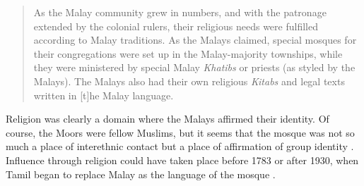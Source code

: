 \begin{quote}
    As the Malay community grew in numbers, and with the patronage extended by the colonial rulers, their religious needs were fulfilled according to Malay traditions. As the Malays claimed, special mosques for their congregations were set up in the Malay-majority townships, while they were ministered by special Malay \textit{Khatibs} or priests (as styled by the Malays). The Malays also had their own religious \textit{Kitabs} and legal texts written in [t]he Malay language.  \citep[19]{Hussainmiya1987}
\end{quote}


Religion was clearly a domain where the Malays affirmed their identity. Of course, the Moors were fellow Muslims, but it seems that the mosque was not so much a place of interethnic contact but a place of affirmation of group identity \citep{Hussainmiya1987}. Influence through religion could have taken place before 1783 or after 1930, when Tamil began to replace Malay as the language of the mosque \citep[23]{Bichsel}.

%
%

 




% 
% 


